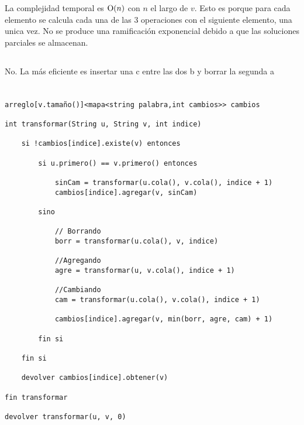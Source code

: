 \subsubsection{}
La complejidad temporal es $\operatorname{O}(n)$ con $n$ el largo de $v$. Esto es porque para cada elemento se calcula cada una de las 3 operaciones con el siguiente elemento, una unica vez. No se produce una ramificación exponencial debido a que las soluciones parciales se almacenan.

\setcounter{subsection}{10}
\subsection{}

\subsubsection{}
No. La más eficiente es insertar una c entre las dos b y borrar la segunda a

\subsubsection{}

\begin{codesnippet}
\begin{verbatim}

arreglo[v.tamaño()]<mapa<string palabra,int cambios>> cambios

int transformar(String u, String v, int indice)

    si !cambios[indice].existe(v) entonces

        si u.primero() == v.primero() entonces

            sinCam = transformar(u.cola(), v.cola(), indice + 1)
            cambios[indice].agregar(v, sinCam)

        sino
    
            // Borrando
            borr = transformar(u.cola(), v, indice)

            //Agregando
            agre = transformar(u, v.cola(), indice + 1)

            //Cambiando
            cam = transformar(u.cola(), v.cola(), indice + 1)

            cambios[indice].agregar(v, min(borr, agre, cam) + 1)

        fin si

    fin si

    devolver cambios[indice].obtener(v)

fin transformar

devolver transformar(u, v, 0)

\end{verbatim}
\end{codesnippet}

